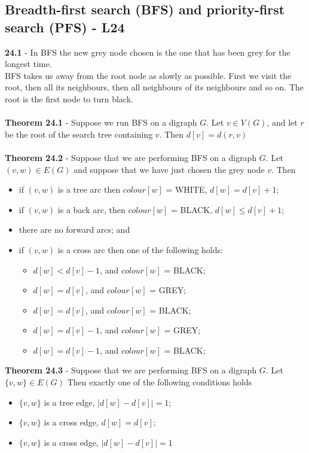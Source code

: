 \documentclass[a4paper]{article}
\begin{document}
\subsection*{Breadth-first search (BFS) and priority-first search (PFS) - L24}
\textbf{24.1} - In BFS the new grey node chosen is the
one that has been grey for the longest time.\\
BFS takes us away from the root node as slowly as possible. First we visit the root,
then all its neighbours, then all neighbours of its neighbours and so on. The root
is the first node to turn black.\\\\
\textbf{Theorem 24.1} - Suppose we run BFS on a digraph $G$. Let $v \in V(G)$, and let $r$ be the
root of the search tree containing $v$. Then $d[v] = d(r, v)$\\\\
\textbf{Theorem 24.2} - Suppose that we are performing BFS on a digraph $G$. Let $(v, w) \in E(G)$
and suppose that we have just chosen the grey node $v$. Then
\begin{itemize}
    \item if $(v,w)$ is a tree arc then $colour[w]$ = WHITE, $d[w] = d[v] + 1$;
    \item if $(v, w)$ is a back arc, then $colour[w]$ = BLACK, $d[w] \leq d[v] + 1$;
    \item there are no forward arcs; and
    \item if $(v, w)$ is a cross arc then one of the following holds:
    \begin{itemize}
        \item $d[w] < d[v] - 1$, and $colour[w]$ = BLACK;
        \item $d[w] = d[v]$, and $colour[w]$ = GREY;
        \item $d[w] = d[v]$, and $colour[w]$ = BLACK;
        \item $d[w] = d[v] - 1$, and $colour[w]$ = GREY;
        \item $d[w] = d[v] - 1$, and $colour[w]$ = BLACK;
    \end{itemize}
\end{itemize}
\textbf{Theorem 24.3} -   Suppose that we are performing BFS on a digraph $G$. Let $\{v, w\} \in E(G)$
Then exactly one of the following conditions holds
\begin{itemize}
    \item $\{v, w\}$ is a tree edge, $|d[w] - d[v]| = 1$;
    \item $\{v, w\}$ is a cross edge, $d[w] = d[v];$
    \item $\{v, w\}$ is a cross edge, $|d[w] - d[v]| = 1$
\end{itemize}
\end{document}
